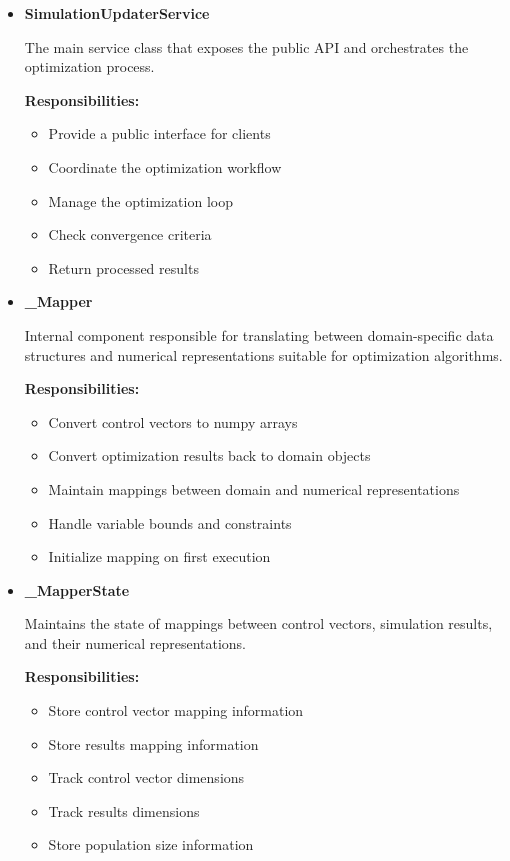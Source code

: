 \begin{itemize}
\item \textbf{SimulationUpdaterService}

The main service class that exposes the public API and orchestrates the optimization process.

\textbf{Responsibilities:}
\begin{itemize}
	\item Provide a public interface for clients
	\item Coordinate the optimization workflow
	\item Manage the optimization loop
	\item Check convergence criteria
	\item Return processed results
\end{itemize}

\item \textbf{\_Mapper}

Internal component responsible for translating between domain-specific data structures and numerical representations suitable for optimization algorithms.

\textbf{Responsibilities:}
\begin{itemize}
	\item Convert control vectors to numpy arrays
	\item Convert optimization results back to domain objects
	\item Maintain mappings between domain and numerical representations
	\item Handle variable bounds and constraints
	\item Initialize mapping on first execution
\end{itemize}

\item \textbf{\_MapperState}

Maintains the state of mappings between control vectors, simulation results, and their numerical representations.

\textbf{Responsibilities:}
\begin{itemize}
	\item Store control vector mapping information
	\item Store results mapping information
	\item Track control vector dimensions
	\item Track results dimensions
	\item Store population size information
\end{itemize}


\end{itemize}
